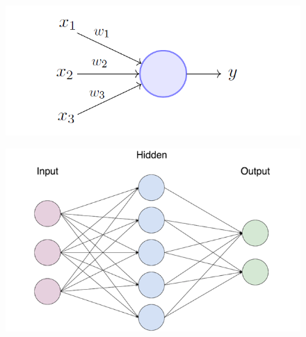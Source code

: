 \documentclass[a4paper,12pt]{article}
\begin{document}
        \begin{figure}[H]
        \centering
        \begin{minipage}[t]{.5\textwidth}
            \centering
            \includegraphics[width=0.9\linewidth]{data/perceptron-model1.png}
            \label{fig:perceptron}
        \end{minipage}%
        \begin{minipage}[t]{.5\textwidth}
            \centering
            \includegraphics[width=0.85\linewidth]{data/easynn-scheme.png}
            \label{fig:easynn}
        \end{minipage}
        \end{figure}
\end{document}

